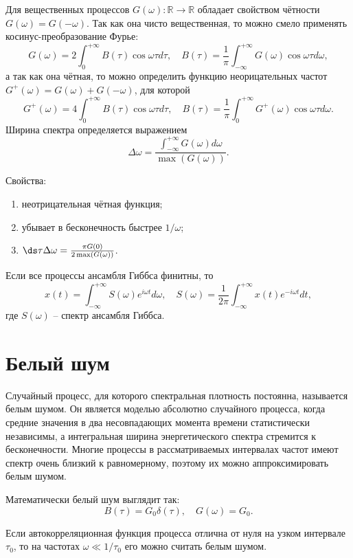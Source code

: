 Для вещественных процессов \( G(\omega): \mathbb{R}\to\mathbb{R} \) обладает
свойством чётности \( G(\omega) = G(-\omega) \). Так как она чисто вещественная,
то можно смело применять косинус-преобразование Фурье:
\[
    G(\omega) = 2\int_0^{+\infty} B(\tau)\cos\omega\tau d\tau,\quad
    B(\tau) =
        \frac{1}{\pi}\int_{-\infty}^{+\infty} G(\omega) \cos\omega\tau d\omega,
\]
а так как она чётная, то можно определить функцию неорицательных частот
\( G^+(\omega) = G(\omega) + G(-\omega) \),  для которой
\[
    G^+(\omega) = 4\int_0^{+\infty} B(\tau)\cos\omega\tau d\tau,\quad
    B(\tau) =
        \frac{1}{\pi}\int_0^{+\infty} G^+(\omega) \cos\omega\tau d\omega.
\]
Ширина спектра определяется выражением
\[
    \Delta\omega =
        \frac{\int_{-\infty}^{+\infty}G(\omega)d\omega}{\max(G(\omega))}.
\]

Свойства:
\begin{enumerate}
    \item неотрицательная чётная функция;
    \item убывает в бесконечность быстрее \( 1/\omega \);
    \item \( \ds \tau\Delta\omega = \frac{\pi G(0)}{2\max(G(\omega))} \).
\end{enumerate}

Если все процессы ансамбля Гиббса финитны, то
\[
    x(t) = \int_{-\infty}^{+\infty}S(\omega)e^{i\omega t}d\omega,\quad
    S(\omega) = \frac{1}{2\pi}\int_{-\infty}^{+\infty}x(t)e^{-i\omega t}dt,
\]
где \( S(\omega) \) -- спектр ансамбля Гиббса.

\section{Белый шум}
Случайный процесс, для которого спектральная плотность постоянна, называется
белым шумом. Он является моделью абсолютно случайного процесса, когда средние
значения в два несовпадающих момента времени статистически независимы, а
интегральная ширина энергетического спектра стремится к бесконечности. Многие
процессы в рассматриваемых интервалах частот имеют спектр очень близкий к
равномерному, поэтому их можно аппроксимировать белым шумом.

Математически белый шум выглядит так:
\[
    B(\tau) = G_0\delta(\tau),\quad G(\omega) = G_0.
\]

Если автокорреляционная функция процесса отлична от нуля на узком интервале
\( \tau_0 \), то на частотах \( \omega \ll 1/\tau_0 \) его можно считать белым
шумом.

